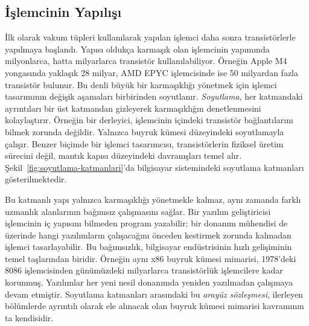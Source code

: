 \subsection{İşlemcinin Yapılışı}
\label{sec:islemcinin-yapilisi}
İlk olarak vakum tüpleri kullanılarak yapılan işlemci daha sonra transistörlerle yapılmaya başlandı. Yapısı oldukça karmaşık olan işlemcinin yapımında milyonlarca, hatta milyarlarca transistör kullanılabiliyor. Örneğin Apple M4 yongasında yaklaşık 28 milyar, AMD EPYC işlemcisinde ise 50 milyardan fazla transistör bulunur. Bu denli büyük bir karmaşıklığı yönetmek için işlemci tasarımının değişik aşamaları birbirinden soyutlanır. \emph{Soyutlama}, her katmandaki ayrıntıları bir üst katmandan gizleyerek karmaşıklığın denetlenmesini kolaylaştırır. Örneğin bir derleyici, işlemcinin içindeki transistör bağlantılarını bilmek zorunda değildir. Yalnızca buyruk kümesi düzeyindeki soyutlamayla çalışır. Benzer biçimde bir işlemci tasarımcısı, transistörlerin fiziksel üretim sürecini değil, mantık kapısı düzeyindeki davranışları temel alır. Şekil~\ref{fig:soyutlama-katmanlari}'da bilgisayar sistemindeki soyutlama katmanları gösterilmektedir.

Bu katmanlı yapı yalnızca karmaşıklığı yönetmekle kalmaz, aynı zamanda farklı uzmanlık alanlarının bağımsız çalışmasını sağlar. Bir yazılım geliştiricisi işlemcinin iç yapısını bilmeden program yazabilir; bir donanım mühendisi de üzerinde hangi yazılımların çalışacağını önceden kestirmek zorunda kalmadan işlemci tasarlayabilir. Bu bağımsızlık, bilgisayar endüstrisinin hızlı gelişiminin temel taşlarından biridir. Örneğin aynı x86 buyruk kümesi mimarisi, 1978'deki 8086 işlemcisinden günümüzdeki milyarlarca transistörlük işlemcilere kadar korunmuş. Yazılımlar her yeni nesil donanımda yeniden yazılmadan çalışmaya devam etmiştir. Soyutlama katmanları arasındaki bu \emph{arayüz sözleşmesi}, ilerleyen bölümlerde ayrıntılı olarak ele alınacak olan buyruk kümesi mimarisi kavramının ta kendisidir.

